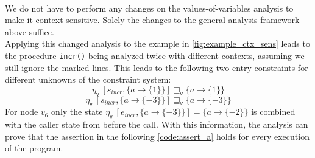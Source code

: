     \\
    We do not have to perform any changes on the values-of-variables analysis to make it context-sensitive. Solely the changes to the general analysis framework above suffice.\\ Applying this changed analysis to the example in \autoref{fig:example_ctx_sens} leads to the procedure \texttt{incr()} being analyzed twice with different contexts, assuming we still ignore the marked lines. This leads to the following two entry constraints for different unknowns of the constraint system:
    \[\eta_\textsf{v}\ [s_{incr}, \{a \rightarrow \{1\} \}] \sqsupseteq_\textsf{v} \{a \rightarrow \{1\} \} \]
    \[\eta_\textsf{v}\ [s_{incr}, \{a \rightarrow \{-3\} \}] \sqsupseteq_\textsf{v} \{a \rightarrow \{-3\} \} \]
    For node $v_6$ only the state $\eta_\textsf{v}\ [e_{incr}, \{a \rightarrow \{-3\} \}] = \{a \rightarrow \{-2\}\}$ is combined with the caller state from before the call. With this information, the analysis can prove that the assertion in the following \autoref{code:assert_a} holds for every execution of the program.

